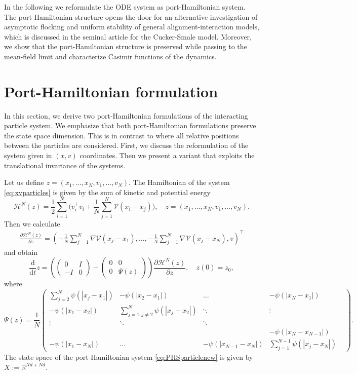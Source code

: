 \documentclass[11pt]{article}
\newcommand{\R}[0]{\mathbb R}
\newcommand{\calH}[0]{\mathcal H}
\newcommand{\calV}[0]{\mathcal V}
\newcommand{\dd}[0]{\mathrm d}
\newcommand{\sumj}[0]{\sum_{j=1}^N}
\newcommand{\sumi}[0]{\sum_{i=1}^N}
\newcommand{\V}[0]{\mathcal V}
\begin{document}
\begin{bibunit}[abbrv]
In the following we reformulate the ODE system as port-Hamiltonian system. The port-Hamilto\-nian structure opens the door for an alternative investigation of asymptotic flocking and uniform stability of general alignment-interaction models, which is discussed in the seminal article \cite{carrillo2010asymptotic} for the Cucker-Smale model. Moreover, we show that the port-Hamiltonian structure is preserved while passing to the mean-field limit and characterize Casimir functions of the dynamics.

\section{Port-Hamiltonian formulation }\label{sec:phsFormulation}

In this section, we derive two port-Hamiltonian formulations of the interacting particle system. We emphasize that both port-Hamiltonian formulations preserve the state space dimension. This is in contrast to \cite{Matei} where all relative positions between the particles are considered. First, we discuss the reformulation of the system given in $(x,v)$ coordinates. Then we present a variant that exploits the translational invariance of the systems.

Let us define $z=(x_1,\dots,x_N,v_1,\dots,v_N)$. The Hamiltonian of the system \eqref{eq:xvparticles} is  given by the sum of kinetic and potential energy
\[
\calH^N(z) = \frac12\sumi \Big(  v_i^\top v_i + \frac1N \sumj \calV(x_i - x_j) \Big),\quad z=(x_1,\dots,x_N, v_1,\dots, v_N).
\]
Then we calculate
\begin{align*}
\frac{\partial \calH^N(z)}{\partial z} = \left(-\frac{1}{N} \sumj \nabla \V(x_{j} - x_{1}), \ldots,  -\frac{1}{N} \sumj \nabla \V(x_{j} - x_{N}) ,v\right)^\top
\end{align*}
and obtain
\begin{equation}\label{eq:PHSparticlenew}
\frac{\dd}{\dd t} z = \left(\begin{pmatrix} 0 & I \\ -I & 0 \end{pmatrix}-\begin{pmatrix} 0 & 0 \\ 0 & \Psi(z) \end{pmatrix}\right) \frac{\partial \calH^N(z)}{\partial z}, \quad z(0)=z_0, 
\end{equation}
where
\[  \Psi(z) =\frac{1}{N}\begin{pmatrix} \displaystyle\sum_{j=2}^N \psi(|x_j-x_1|) &-\psi(|x_2-x_1|) & \ldots & -\psi(|x_N-x_1|)\\
-\psi(|x_1-x_2|) & \displaystyle\sum_{j=1,j\ne 2}^N \psi(|x_j-x_2|)& \ddots & \vdots\\
\vdots &\ddots &\ddots&&\\
&&&-\psi(|x_N-x_{N-1}|)\\
-\psi(|x_1-x_N|)&\ldots&-\psi(|x_{N-1}-x_N|)&\displaystyle\sum_{j=1}^{N-1} \psi(|x_j-x_N|)\end{pmatrix}.\]
The state space of the port-Hamiltonian system \eqref{eq:PHSparticlenew} is given by $X:=\R^{Nd+Nd}$.


\end{bibunit}
\end{document}
